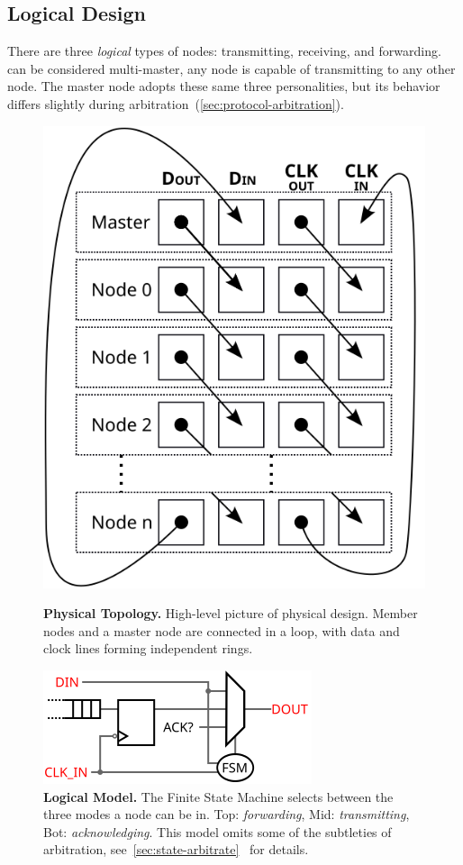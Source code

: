 \subsection{Logical Design}
\label{sec:logical}

There are three {\em logical} types of \bus nodes: transmitting, receiving,
and forwarding. \bus can be considered multi-master, any node is capable of
transmitting to any other node. The master node adopts these same three
personalities, but its behavior differs slightly during
arbitration~(\ref{sec:protocol-arbitration}).

\begin{figure}
  \begin{minipage}[b]{.48\linewidth}
    \centering
    \includegraphics[width=0.5\linewidth]{img/stacked_layers}
    \caption{\textbf{\bus Physical Topology.} \textmd{
        High-level picture of \bus physical design. Member nodes and a master
        node are connected in a loop, with data and clock lines forming
        independent rings.
    }}
    \label{fig:bus}
  \end{minipage}
  \hspace{1 em}
  \begin{minipage}[b]{.48\linewidth}
    \centering
    \includegraphics[width=\textwidth]{img/logical}
    \caption{\textbf{Logical Model.} \textmd{
        The Finite State Machine selects between the three modes a node can be
        in. Top: {\em forwarding}, Mid: {\em transmitting}, Bot: {\em
        acknowledging}. This model omits some of the subtleties of
        arbitration,
        see~\ref{sec:state-arbitrate}~ for
        details.
    }}
    \label{fig:logical}
  \end{minipage}
\end{figure}

